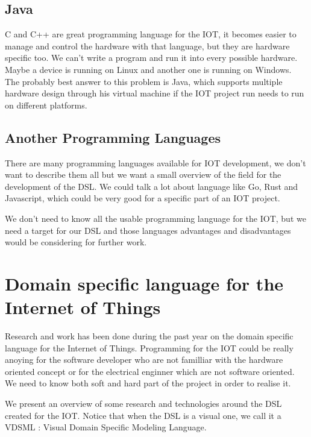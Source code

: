 \subsection{Java}
\label{subsec:java}

C and C++ are great programming language for the IOT, it becomes easier to manage
and control the hardware with that language, but they are hardware specific
too. We can’t write a program and run it into every possible hardware. Maybe a
device is running on Linux and another one is running on Windows. The probably
best answer to this problem is Java\cite{Waher:2015:LIT:2789499}, which supports
multiple hardware design through his virtual machine if the IOT project run
needs to run on different platforms.

\subsection{Another Programming Languages}
\label{subsec:other-prog-lang}

There are many programming languages available for IOT development, we don’t want
to describe them all but we want a small overview of the field for the
development of the DSL. We could talk a lot about language like Go, Rust and
Javascript, which could be very good for a specific part of an IOT project.

We don’t need to know all the usable programming language for the IOT, but we
need a target for our DSL and those languages advantages and disadvantages
would be considering for further work.

\section{Domain specific language for the Internet of Things}
\label{sec:dsl-for-iot}

Research and work has been done during the past year on the domain specific
language for the Internet of Things. Programming for the IOT could be really
anoying for the software developer who are not familliar with the hardware oriented
concept or for the electrical enginner which are not software oriented. We need
to know both soft and hard part of the project in order to realise it.

We present an overview of some research and technologies around the DSL created
for the IOT. Notice that when the DSL is a visual one, we call it a VDSML :
Visual Domain Specific Modeling Language.

